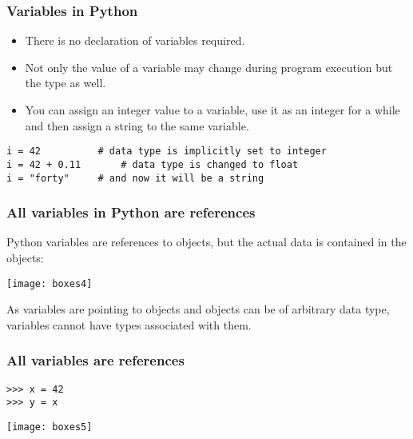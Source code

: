 \begin{frame}[fragile]\frametitle{Variables in Python}

  \begin{itemize}
  \item There is no declaration of variables required.
  \item Not only the value of a variable may change during program execution but the type as well.
\item You can assign an integer value to a variable, use it as an integer for a while and then assign a string to the same variable. 
    \end{itemize}

  \begin{lstlisting}
i = 42			# data type is implicitly set to integer
i = 42 + 0.11		# data type is changed to float
i = "forty"		# and now it will be a string  
\end{lstlisting}
  
\end{frame}


\begin{frame}[fragile]\frametitle{All variables in Python are references}
Python variables are references to objects, but the actual data is contained in the objects: 

    \begin{center}
\texttt{[image: boxes4]}
\end{center}
  
  As variables are pointing to objects and objects can be of arbitrary data type, variables cannot have types associated with them.
  
   
   
\end{frame}


\begin{frame}[fragile]\frametitle{All variables are references}
\begin{lstlisting}
>>> x = 42
>>> y = x
\end{lstlisting}



    \begin{center}
\texttt{[image: boxes5]}
\end{center}
  
  
   
   
\end{frame}



